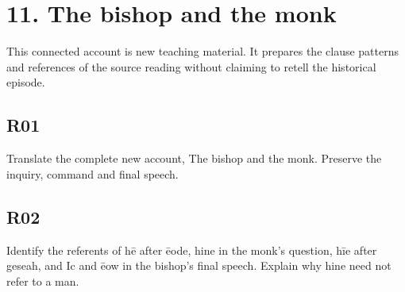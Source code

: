 \section*{11. The bishop and the monk}

This connected account is new teaching material. It prepares the clause patterns and references of the source reading without claiming to retell the historical episode.

\par\begin{minipage}{\linewidth}\raggedright
{}
\end{minipage}\par

\par\begin{minipage}{\linewidth}\raggedright
\subsection*{R01}

Translate the complete new account, The bishop and the monk. Preserve the inquiry, command and final speech.

\end{minipage}\par\addvspace{4pt}

\par\begin{minipage}{\linewidth}\raggedright
\subsection*{R02}

Identify the referents of hē after ēode, hine in the monk’s question, hīe after geseah, and Ic and ēow in the bishop’s final speech. Explain why hine need not refer to a man.

\end{minipage}\par\addvspace{4pt}

